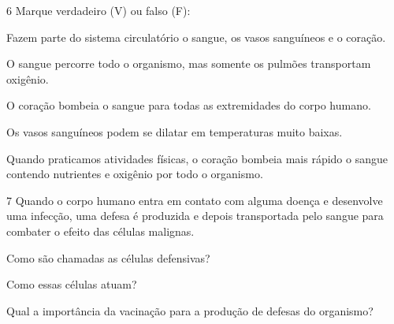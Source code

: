 \num{6} Marque verdadeiro (V) ou falso (F):

\begin{boxlist}
 Fazem parte do sistema circulatório o sangue, os vasos sanguíneos e o coração.

 O sangue percorre todo o organismo, mas somente os pulmões transportam oxigênio.

 O coração bombeia o sangue para todas as extremidades do corpo humano.

 Os vasos sanguíneos podem se dilatar em temperaturas muito baixas.

 Quando praticamos atividades físicas, o coração bombeia mais rápido 
o sangue contendo nutrientes e oxigênio por todo o organismo.
\end{boxlist}


\num{7} Quando o corpo humano entra em contato com alguma doença e
desenvolve uma infecção, uma defesa é produzida e depois transportada
pelo sangue para combater o efeito das células malignas.

\begin{escolha}
\item Como são chamadas as células defensivas?\\

\item Como essas células atuam?\\

\item Qual a importância da vacinação para a produção de defesas do organismo?\\
\end{escolha}

